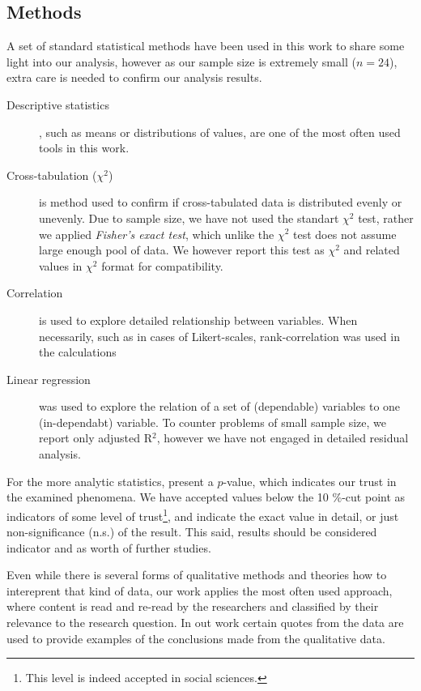 \subsection{Methods}
\label{sec:methods}


A set of standard statistical methods have been used in this work to share some light into our analysis, however as our sample size is extremely small ($n=24$), extra care is needed to confirm our analysis results.

\begin{description}
\item[Descriptive statistics], such as means or distributions of values, are one of the most often used tools in this work.
\item[Cross-tabulation ($\chi^2$)] is method used to confirm if cross-tabulated data is distributed evenly or unevenly. Due to sample size, we have not used the standart $\chi^2$ test, rather we applied \textit{Fisher's exact test}, which unlike the $\chi^2$ test does not assume large enough pool of data. We however report this test as $\chi^2$ and related values in $\chi^2$ format for compatibility.
\item[Correlation] is used to explore detailed relationship between variables. When necessarily, such as in cases of Likert-scales, rank-correlation was used in the calculations
\item[Linear regression] was used to explore the relation of a set of (dependable) variables to one (in-dependabt) variable. To counter problems of small sample size, we report only adjusted R$^2$, however we have not engaged in detailed residual analysis.
\end{description}

For the more analytic statistics, present a $p$-value, which indicates our trust in the examined phenomena. We have accepted values below the 10 \%-cut point as indicators of some level of trust\footnote{This level is indeed accepted in social sciences.}, and indicate the exact value in detail, or just non-significance (n.s.) of the result. This said, results should be considered indicator and as worth of further studies.


Even while there is several forms of qualitative methods and theories how to intereprent that kind of data, our work applies the most often used  approach, where content is read and re-read by the researchers and classified by their relevance to the research question. In out work certain quotes from the data are used to provide examples of the conclusions made from the qualitative data.